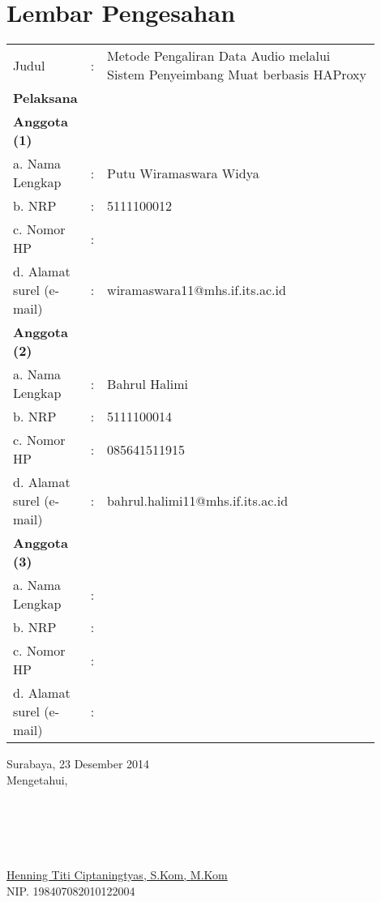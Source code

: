 \chapter{Lembar Pengesahan}
\begin{tabular}{llp{0.9\linewidth}}
Judul & : & Metode Pengaliran Data Audio melalui Sistem Penyeimbang Muat berbasis HAProxy 
\\
\textbf{Pelaksana} \\
\textbf{Anggota (1)} \\
a. Nama Lengkap & : & Putu Wiramaswara Widya\\
b. NRP & :&5111100012\\
c. Nomor HP & :&\\
d. Alamat surel (e-mail) & :&wiramaswara11@mhs.if.its.ac.id\\
\textbf{Anggota (2)} \\
a. Nama Lengkap & :&Bahrul Halimi\\
b. NRP & :&5111100014\\
c. Nomor HP & :&085641511915\\
d. Alamat surel (e-mail) & :&bahrul.halimi11@mhs.if.its.ac.id\\
\textbf{Anggota (3)} \\
a. Nama Lengkap & :&\\
b. NRP & :&\\
c. Nomor HP & :&\\
d. Alamat surel (e-mail) & :&\\
\end{tabular}

\begin{center}
    Surabaya, 23 Desember 2014 \\
    Mengetahui,	\\
    \ \\
    \ \\
    \ \\
    \ \\
    \ \\
    \underline{Henning Titi Ciptaningtyas, S.Kom, M.Kom} \\
    NIP. 198407082010122004
\end{center}


